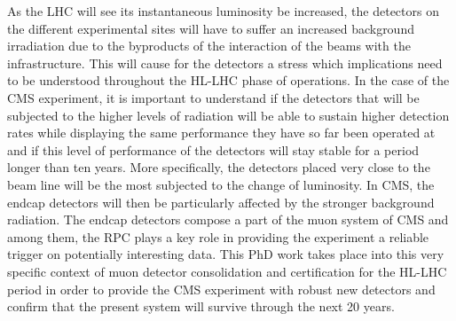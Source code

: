 As the \acl{LHC} will see its instantaneous luminosity be increased, the detectors on the different experimental sites will have to suffer an increased background irradiation due to the byproducts of the interaction of the beams with the infrastructure. This will cause for the detectors a stress which implications need to be understood throughout the \acf{HL-LHC} phase of operations. In the case of the \acf{CMS} experiment, it is important to understand if the detectors that will be subjected to the higher levels of radiation will be able to sustain higher detection rates while displaying the same performance they have so far been operated at and if this level of performance of the detectors will stay stable for a period longer than ten years. More specifically, the detectors placed very close to the beam line will be the most subjected to the change of luminosity. In CMS, the endcap detectors will then be particularly affected by the stronger background radiation. The endcap detectors compose a part of the muon system of CMS and among them, the \acf{RPC} plays a key role in providing the experiment a reliable trigger on potentially interesting data. This PhD work takes place into this very specific context of muon detector consolidation and certification for the HL-LHC period in order to provide the CMS experiment with robust new detectors and confirm that the present system will survive through the next 20 years.

